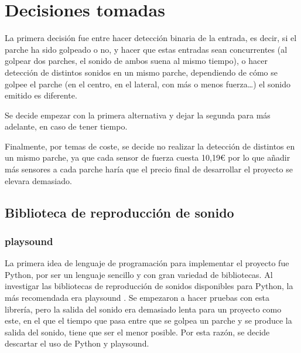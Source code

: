 

    \section{Decisiones tomadas} %
    \label{sec:DecisionesTomadas}

        La primera decisión fue entre hacer detección binaria de la entrada, es decir, si el parche ha sido golpeado o
        no, y hacer que estas entradas sean concurrentes (al golpear dos parches, el sonido de ambos suena al mismo
        tiempo), o hacer detección de distintos sonidos en un mismo parche, dependiendo de cómo se golpee el parche (en
        el centro, en el lateral, con más o menos fuerza…) el sonido emitido es diferente.

        Se decide empezar con la primera alternativa y dejar la segunda para más adelante, en caso de tener tiempo.

        Finalmente, por temas de coste, se decide no realizar la detección de distintos en un mismo parche, ya que cada
        sensor de fuerza cuesta 10,19\euro{} por lo que añadir más sensores a cada parche haría que el precio final de
        desarrollar el proyecto se elevara demasiado.

        \subsection{Biblioteca de reproducción de sonido} %
        \label{sub:LibreriaDeReproduccionDeSonido}

            \subsubsection{playsound} %
            \label{ssub:Playsound}

                La primera idea de lenguaje de programación para implementar el proyecto fue Python, por ser un lenguaje
                sencillo y con gran variedad de bibliotecas. Al investigar las bibliotecas de reproducción de sonidos
                disponibles para Python, la más recomendada era playsound \cite{playsound}. Se empezaron a hacer pruebas
                con esta librería, pero la salida del sonido era demasiado lenta para un proyecto como este, en el que
                el tiempo que pasa entre que se golpea un parche y se produce la salida del sonido, tiene que ser el
                menor posible. Por esta razón, se decide descartar el uso de Python y playsound.

